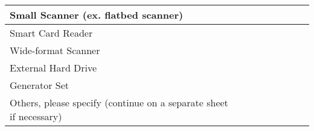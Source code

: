 \documentclass[a4paper,10pt, total={10.95in, 8in}]{article} %
\begin{document}
\begin{table}[H]
\begin{adjustbox}{width=6in}
\begin{tabular}{|p{6.5cm}|lllllll|}
Small Scanner (ex. flatbed scanner)                                & \multicolumn{1}{l|}{}               & \multicolumn{1}{l|}{}                & \multicolumn{1}{l|}{}               & \multicolumn{1}{l|}{}                & \multicolumn{1}{l|}{}               & \multicolumn{1}{l|}{}                &                                                                  \\ \hline
Smart Card Reader                                                  & \multicolumn{1}{l|}{}               & \multicolumn{1}{l|}{}                & \multicolumn{1}{l|}{}               & \multicolumn{1}{l|}{}                & \multicolumn{1}{l|}{}               & \multicolumn{1}{l|}{}                &                                                                  \\ \hline
Wide-format Scanner                                                & \multicolumn{1}{l|}{}               & \multicolumn{1}{l|}{}                & \multicolumn{1}{l|}{}               & \multicolumn{1}{l|}{}                & \multicolumn{1}{l|}{}               & \multicolumn{1}{l|}{}                &                                                                  \\ \hline
External Hard Drive                                                & \multicolumn{1}{l|}{}               & \multicolumn{1}{l|}{}                & \multicolumn{1}{l|}{}               & \multicolumn{1}{l|}{}                & \multicolumn{1}{l|}{}               & \multicolumn{1}{l|}{}                &                                                                  \\ \hline
Generator Set                                                      & \multicolumn{1}{l|}{}               & \multicolumn{1}{l|}{}                & \multicolumn{1}{l|}{}               & \multicolumn{1}{l|}{}                & \multicolumn{1}{l|}{}               & \multicolumn{1}{l|}{}                &                                                                  \\ \hline
Others, please specify (continue on a separate sheet if necessary) & \multicolumn{1}{l|}{}               & \multicolumn{1}{l|}{}                & \multicolumn{1}{l|}{}               & \multicolumn{1}{l|}{}                & \multicolumn{1}{l|}{}               & \multicolumn{1}{l|}{}                &                                                                  \\ \hline
\end{tabular}
\end{adjustbox}
\end{table}
\end{document}
